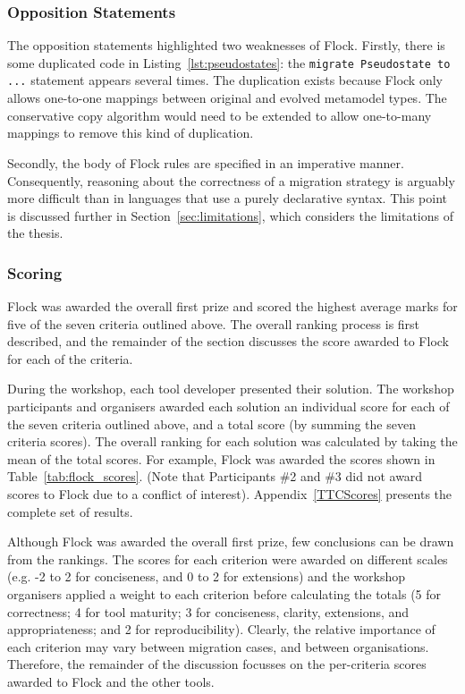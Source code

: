 \subsubsection{Opposition Statements}
The opposition statements highlighted two weaknesses of Flock. Firstly, there is some duplicated code in Listing~\ref{lst:pseudostates}: the \texttt{migrate Pseudostate to ...} statement appears several times. The duplication exists because Flock only allows one-to-one mappings between original and evolved metamodel types. The conservative copy algorithm would need to be extended to allow one-to-many mappings to remove this kind of duplication.

Secondly, the body of Flock rules are specified in an imperative manner. Consequently, reasoning about the correctness of a migration strategy is arguably more difficult than in languages that use a purely declarative syntax. This point is discussed further in Section~\ref{sec:limitations}, which considers the limitations of the thesis.

\subsubsection{Scoring}
Flock was awarded the overall first prize and scored the highest average marks for five of the seven criteria outlined above. The overall ranking process is first described, and the remainder of the section discusses the score awarded to Flock for each of the criteria.

During the workshop, each tool developer presented their solution. The workshop participants and organisers awarded each solution an individual score for each of the seven criteria outlined above, and a total score (by summing the seven criteria scores). The overall ranking for each solution was calculated by taking the mean of the total scores. For example, Flock was awarded the scores shown in Table~\ref{tab:flock_scores}. (Note that Participants \#2 and \#3 did not award scores to Flock due to a conflict of interest). Appendix~\ref{TTCScores} presents the complete set of results.

Although Flock was awarded the overall first prize, few conclusions can be drawn from the rankings. The scores for each criterion were awarded on different scales (e.g. -2 to 2 for conciseness, and 0 to 2 for extensions) and the workshop organisers applied a weight to each criterion before calculating the totals (5 for correctness; 4 for tool maturity; 3 for conciseness, clarity, extensions, and appropriateness; and 2 for reproducibility). Clearly, the relative importance of each criterion may vary between migration cases, and between organisations. Therefore, the remainder of the discussion focusses on the per-criteria scores awarded to Flock and the other tools.

